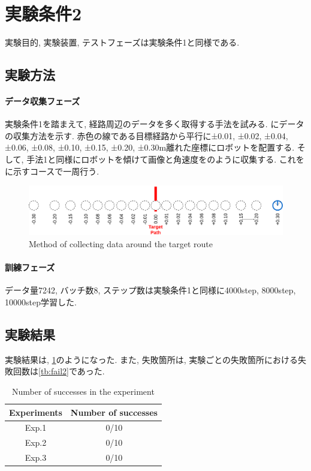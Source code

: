 \newpage
\section{実験条件2}
実験目的, 実験装置, テストフェーズは実験条件1と同様である.
\subsection{実験方法}
\paragraph{データ収集フェーズ}
実験条件1を踏まえて, 経路周辺のデータを多く取得する手法を試みる. にデータの収集方法を示す. 赤色の線である目標経路から平行に±0.01, ±0.02, ±0.04, ±0.06, ±0.08, ±0.10, ±0.15, ±0.20, ±0.30m離れた座標にロボットを配置する. そして, 手法1と同様にロボットを傾けて画像と角速度をのように収集する. これをに示すコースで一周行う. 

\begin{figure}[h]
  \centering
  \includegraphics[keepaspectratio, scale=0.18]{images/collect-data.png}
  \caption{Method of collecting data around the target route}
  \label{Fig:collect-data}
  \end{figure}

\paragraph{訓練フェーズ}
データ量7242, バッチ数8, ステップ数は実験条件1と同様に4000step, 8000step, 10000step学習した.

\subsection{実験結果}
実験結果は, \ref{tb:exp2}のようになった. また, 失敗箇所は, 実験ごとの失敗箇所における失敗回数は\ref{tb:fail2}であった. 

\begin{table}[h]
  \centering
  \begin{tabular}{|c|c|} \hline
    Experiments & Number of successes \\ \hline
    Exp.1 & 0/10 \\ \hline
    Exp.2 & 0/10 \\ \hline
    Exp.3 & 0/10 \\ \hline
  \end{tabular}
  \caption{Number of successes in the experiment}
  \label{tb:exp2}
\end{table}

